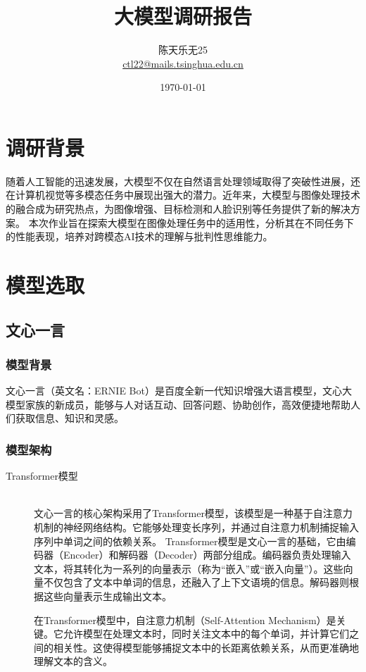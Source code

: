 \documentclass[UTF8]{ctexart}
\title{大模型调研报告}
\author{陈天乐\quad 无25\quad [student ID removed]\\ \href{mailto:ctl22@mails.tsinghua.edu.cn}{ctl22@mails.tsinghua.edu.cn}}
\date{\today}
\begin{document}
\fancyfoot[C]{\thepage}

\maketitle
\tableofcontents
\newpage

\section{调研背景}
随着人工智能的迅速发展，大模型不仅在自然语言处理领域取得了突破性进展，还在计算机视觉等多模态任务中展现出强大的潜力。近年来，大模型与图像处理技术的融合成为研究热点，为图像增强、目标检测和人脸识别等任务提供了新的解决方案。
本次作业旨在探索大模型在图像处理任务中的适用性，分析其在不同任务下的性能表现，培养对跨模态AI技术的理解与批判性思维能力。

\section{模型选取}

\subsection{文心一言}
\subsubsection{模型背景}
文心一言（英文名：ERNIE Bot）是百度全新一代知识增强大语言模型，文心大模型家族的新成员，能够与人对话互动、回答问题、协助创作，高效便捷地帮助人们获取信息、知识和灵感。

\subsubsection{模型架构}
\begin{description}
    \item[Transformer模型] \leavevmode \\
    文心一言的核心架构采用了Transformer模型，该模型是一种基于自注意力机制的神经网络结构。它能够处理变长序列，并通过自注意力机制捕捉输入序列中单词之间的依赖关系。
Transformer模型是文心一言的基础，它由编码器（Encoder）和解码器（Decoder）两部分组成。编码器负责处理输入文本，将其转化为一系列的向量表示（称为“嵌入”或“嵌入向量”）。这些向量不仅包含了文本中单词的信息，还融入了上下文语境的信息。解码器则根据这些向量表示生成输出文本。

在Transformer模型中，自注意力机制（Self-Attention Mechanism）是关键。它允许模型在处理文本时，同时关注文本中的每个单词，并计算它们之间的相关性。这使得模型能够捕捉文本中的长距离依赖关系，从而更准确地理解文本的含义。
\end{description}
\end{document}
